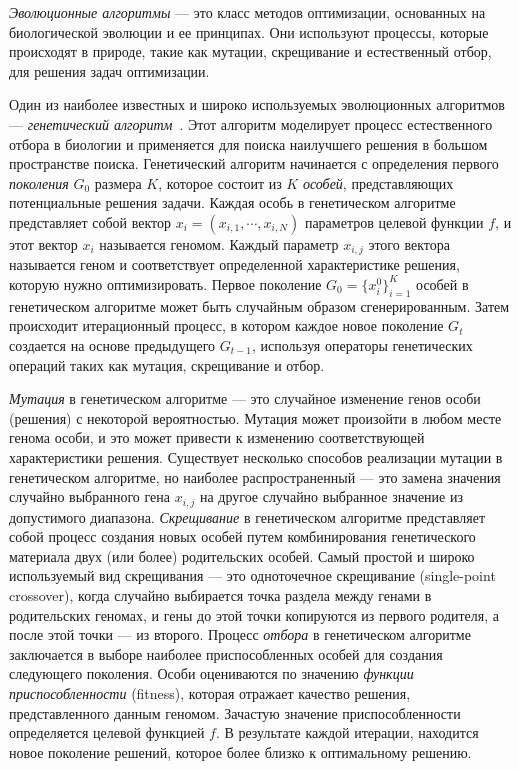 \emph{Эволюционные алгоритмы} --- это класс методов оптимизации, основанных на биологической эволюции и ее принципах.
Они используют процессы, которые происходят в природе, такие как мутации, скрещивание и естественный отбор, для решения задач оптимизации.

Один из наиболее известных и широко используемых эволюционных алгоритмов --- \emph{генетический алгоритм}~\cite{holland1975adaptation}. 
Этот алгоритм моделирует процесс естественного отбора в биологии и применяется для поиска наилучшего решения в большом пространстве поиска.
Генетический алгоритм начинается с определения первого \emph{поколения} $G_0$ размера $K$, которое состоит из $K$ \emph{особей}, представляющих потенциальные решения задачи.
Каждая особь в генетическом алгоритме представляет собой вектор $x_i = (x_{i, 1}, \cdots, x_{i, N})$ параметров целевой функции $f$, и этот вектор $x_i$ называется геномом.
Каждый параметр $x_{i, j}$ этого вектора называется геном и соответствует определенной характеристике решения, которую нужно оптимизировать.
Первое поколение $G_0 = \{x^0_i\}_{i=1}^K$ особей в генетическом алгоритме может быть случайным образом сгенерированным.
Затем происходит итерационный процесс, в котором каждое новое поколение $G_t$ создается на основе предыдущего $G_{t-1}$, используя операторы генетических операций таких как мутация, скрещивание и отбор.

\emph{Мутация} в генетическом алгоритме --- это случайное изменение генов особи (решения) с некоторой вероятностью.
Мутация может произойти в любом месте генома особи, и это может привести к изменению соответствующей характеристики решения.
Существует несколько способов реализации мутации в генетическом алгоритме, но наиболее распространенный --- это замена значения случайно выбранного гена $x_{i, j}$ на другое случайно выбранное значение из допустимого диапазона.
\emph{Скрещивание} в генетическом алгоритме представляет собой процесс создания новых особей путем комбинирования генетического материала двух (или более) родительских особей.
Самый простой и широко используемый вид скрещивания --- это одноточечное скрещивание (single-point crossover), когда случайно выбирается точка раздела между генами в родительских геномах, и гены до этой точки копируются из первого родителя, а после этой точки --- из второго.
Процесс \emph{отбора} в генетическом алгоритме заключается в выборе наиболее приспособленных особей для создания следующего поколения.
Особи оцениваются по значению \emph{функции приспособленности} (fitness), которая отражает качество решения, представленного данным геномом.
Зачастую значение приспособленности определяется целевой функцией $f$.
В результате каждой итерации, находится новое поколение решений, которое более близко к оптимальному решению.

